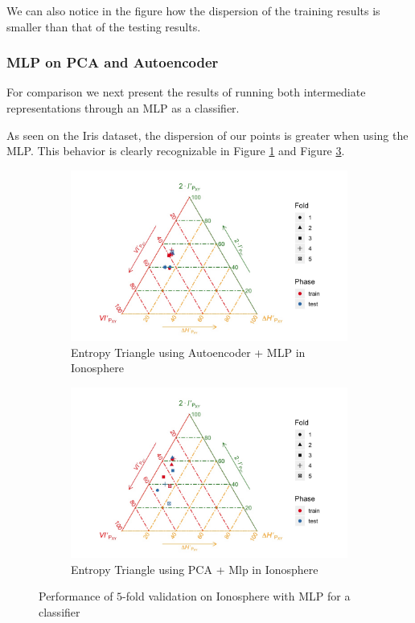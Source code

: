 We can also notice in the figure how the dispersion of the training results is smaller than that of the testing results. 

\subsubsection{MLP on PCA and Autoencoder}

For comparison we next present the results of running both intermediate representations through an MLP as a classifier.


As seen on the Iris dataset, the dispersion of our points is greater when using the MLP. This behavior is clearly recognizable in Figure \ref{fig:figure_Mlp_Iono_ET_Auto} and Figure \ref{fig:figure_Mlp_Iono_ET_PCA}.
%
\begin{figure}
\begin{subfigure}{\textwidth}  
	\centering
	\includegraphics[width=\linewidth]{Figuras_tfg/ET_Iono_Auto_Mlp}
	\caption{Entropy Triangle using Autoencoder + MLP in Ionosphere}
	\label{fig:figure_Mlp_Iono_ET_Auto}
\end{subfigure}

\begin{subfigure}{\textwidth}  
	\centering
	\includegraphics[width=\linewidth]{Figuras_tfg/ET_Iono_PCA_Mlp}
	\caption{Entropy Triangle using PCA + Mlp in Ionosphere}
	\label{fig:figure_Mlp_Iono_ET_PCA}
\end{subfigure}


\caption{Performance of $5$-fold validation on Ionosphere with MLP for a classifier}
\end{figure}

